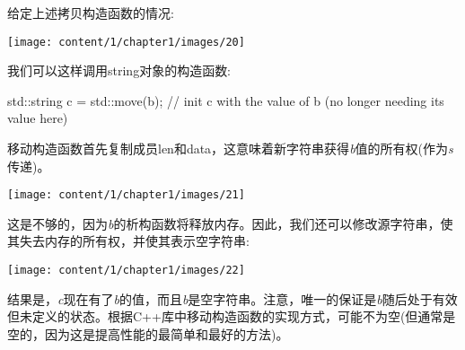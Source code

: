 给定上述拷贝构造函数的情况:

\begin{center}
	\texttt{[image: content/1/chapter1/images/20]}
\end{center}

我们可以这样调用string对象的构造函数:

\begin{cppcode}
std::string c = std::move(b); // init c with the value of b (no longer needing its value here)
\end{cppcode}

移动构造函数首先复制成员len和data，这意味着新字符串获得\textit{b}值的所有权(作为\textit{s}传递)。

\begin{center}
	\texttt{[image: content/1/chapter1/images/21]}
\end{center}

这是不够的，因为\textit{b}的析构函数将释放内存。因此，我们还可以修改源字符串，使其失去内存的所有权，并使其表示空字符串:

\begin{center}
	\texttt{[image: content/1/chapter1/images/22]}
\end{center}

结果是，\textit{c}现在有了\textit{b}的值，而且\textit{b}是空字符串。注意，唯一的保证是\textit{b}随后处于有效但未定义的状态。根据C++库中移动构造函数的实现方式，可能不为空(但通常是空的，因为这是提高性能的最简单和最好的方法)。


















